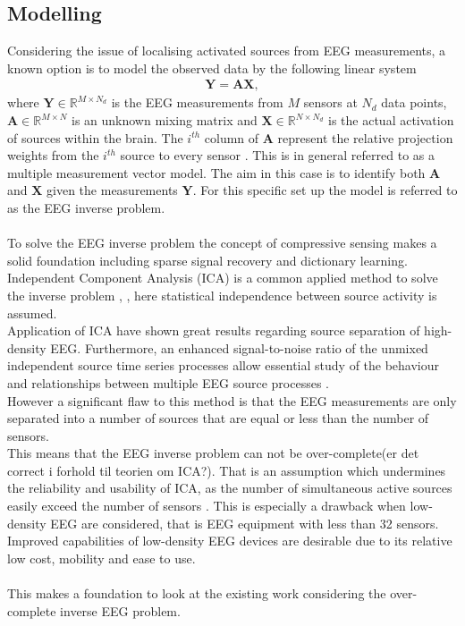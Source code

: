 \subsection{Modelling}
Considering the issue of localising activated sources from EEG measurements, a known option is to model the observed data by the following linear system 
\begin{align*}
\mathbf{Y} = \mathbf{AX},
\end{align*}
where $\mathbf{Y} \in \mathbb{R}^{M\times N_d}$ is the EEG measurements from $M$ sensors at $N_d$ data points, $\mathbf{A} \in \mathbb{R}^{M \times N}$ is an unknown mixing matrix and $\mathbf{X} \in \mathbb{R}^{N \times N_d}$ is the actual activation of sources within the brain. The $i^{th}$ column of $\textbf{A}$ represent the relative projection weights from the $i^{th}$ source to every sensor \cite{phd2015}. This is in general referred to as a multiple measurement vector model. The aim in this case is to identify both $\textbf{A}$ and $\textbf{X}$ given the measurements $\textbf{Y}$. For this specific set up the model is referred to as the EEG inverse problem.  
\\
\\
To solve the EEG inverse problem the concept of compressive sensing makes a solid foundation including sparse signal recovery and dictionary learning. Independent Component Analysis (ICA) is a common applied method to solve the inverse problem \cite{Scott1996}, \cite{Scott1997}, here statistical independence between source activity is assumed. 
\\
Application of ICA have shown great results regarding source separation of high-density EEG. Furthermore, an enhanced signal-to-noise ratio of the unmixed independent source time series processes allow essential study of the behaviour and relationships between multiple EEG source processes \cite{Arnaud2012}. 
\\
However a significant flaw to this method is that the EEG measurements are only separated into a number of sources that are equal or less than the number of sensors\cite{Balkan2015}.
\\
This means that the EEG inverse problem can not be over-complete(er det correct i forhold til teorien om ICA?). That is an assumption which undermines the reliability and usability of ICA, as the number of simultaneous active sources easily exceed the number of sensors \cite{phd2015}. This is especially a drawback when low-density EEG are considered, that is EEG equipment with less than 32 sensors. Improved capabilities of low-density EEG devices are desirable due to its relative low cost, mobility and ease to use. 
\\  
\\
This makes a foundation to look at the existing work considering the over-complete inverse EEG problem. 

